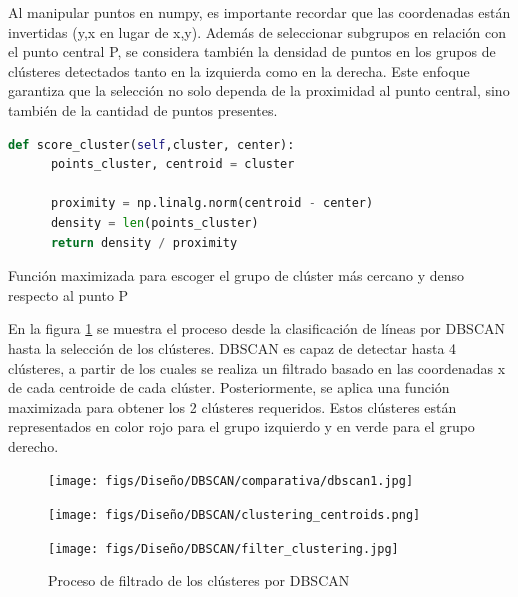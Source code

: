 Al manipular puntos en numpy, es importante recordar que las coordenadas están invertidas (y,x en lugar de x,y). Además de seleccionar subgrupos en relación con el punto central P, 
se considera también la densidad de puntos en los grupos de clústeres detectados tanto en la izquierda como en la derecha. Este enfoque garantiza que la selección no solo dependa 
de la proximidad al punto central, sino también de la cantidad de puntos presentes.
\begin{code}[h]
  \begin{lstlisting}[language=Python]
    def score_cluster(self,cluster, center):
      points_cluster, centroid = cluster
    
      proximity = np.linalg.norm(centroid - center)
      density = len(points_cluster)
      return density / proximity

  \end{lstlisting}
  \caption[Función maximizada para escoger el grupo de cluster más cercano y denso respecto al punto P]{Función maximizada para escoger el grupo de clúster más cercano y denso respecto al punto P}
  \label{cod:funcion_maximizada}
  \vspace{-1.5em}
  \end{code}  
 
  En la figura \ref{fig:comparativa} se muestra el proceso desde la clasificación de líneas por DBSCAN hasta la selección de los clústeres. 
  DBSCAN es capaz de detectar hasta 4 clústeres, a partir de los cuales se realiza un filtrado basado en las coordenadas x de cada centroide de cada clúster. Posteriormente, 
  se aplica una función maximizada para obtener los 2 clústeres requeridos. Estos clústeres están representados en color rojo para el grupo izquierdo y en verde para el grupo 
  derecho. 
  \begin{figure}[H]
    \centering
    \begin{minipage}{0.3\textwidth}
      \texttt{[image: figs/Diseño/DBSCAN/comparativa/dbscan1.jpg]}
    \end{minipage}
    \hfill
    \begin{minipage}{0.3\textwidth}
      \texttt{[image: figs/Diseño/DBSCAN/clustering\_centroids.png]}
    \end{minipage}
    \hfill
    \begin{minipage}{0.3\textwidth}
      \texttt{[image: figs/Diseño/DBSCAN/filter\_clustering.jpg]}
    \end{minipage}
    \caption{Proceso de filtrado de los clústeres por DBSCAN}
    \label{fig:comparativa}
  \end{figure}

